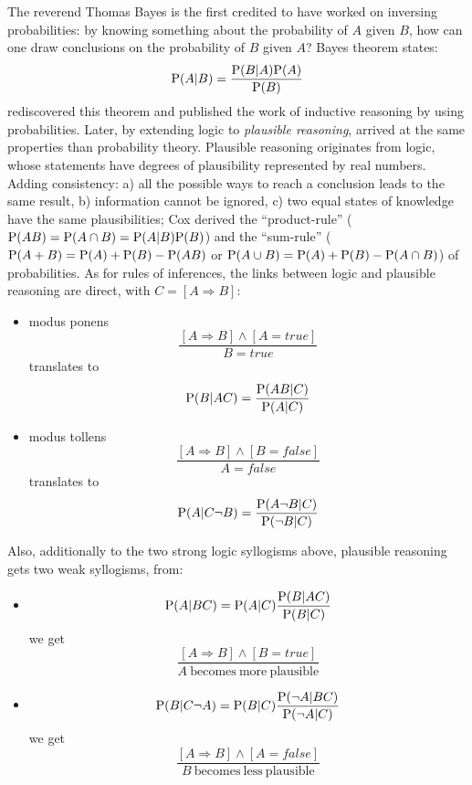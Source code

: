 The reverend Thomas Bayes is the first credited to have worked on inversing probabilities: by knowing something about the probability of $A$ given $B$, how can one draw conclusions on the probability of $B$ given $A$? Bayes theorem states: $$\mathrm{P}(A|B) = \frac{\mathrm{P}(B|A)\mathrm{P}(A)}{\mathrm{P}(B)}$$
\cite{Laplace} rediscovered this theorem and published the work of inductive reasoning by using probabilities. Later, by extending logic to \textit{plausible reasoning}, \cite{Jaynes} arrived at the same properties than \cite{Kolmogorov33} probability theory. Plausible reasoning originates from logic, whose statements have degrees of plausibility represented by real numbers. %
Adding consistency: a) all the possible ways to reach a conclusion leads to the same result, b) information cannot be ignored, c) two equal states of knowledge have the same plausibilities; Cox %
derived the ``product-rule'' ($\mathrm{P}(AB)=\mathrm{P}(A\cap B)=\mathrm{P}(A|B)\mathrm{P}(B)$) and the ``sum-rule'' ($\mathrm{P}(A+B)=\mathrm{P}(A)+\mathrm{P}(B)-\mathrm{P}(AB)$ or $\mathrm{P}(A\cup B) = \mathrm{P}(A)+\mathrm{P}(B)-\mathrm{P}(A\cap B)$) of probabilities. As for rules of inferences, the links between logic and plausible reasoning are direct, with $C=[A\Rightarrow B]$:
\begin{itemize}
    \item modus ponens $$\frac{[A\Rightarrow B] \wedge [A=true]}{B=true}$$ translates to $$\mathrm{P}(B|AC)=\frac{\mathrm{P}(AB|C)}{\mathrm{P}(A|C)}$$
    \item modus tollens $$\frac{[A\Rightarrow B] \wedge [B=false]}{A=false}$$ translates to $$\mathrm{P}(A|C\neg B)=\frac{\mathrm{P}(A \neg B|C)}{\mathrm{P}(\neg B|C)}$$
\end{itemize}
Also, additionally to the two strong logic syllogisms above, plausible reasoning gets two weak syllogisms, from:
\begin{itemize}
    \item $$\mathrm{P}(A|BC)=\mathrm{P}(A|C)\frac{\mathrm{P}(B|AC)}{\mathrm{P}(B|C)}$$ we get $$\frac{[A\Rightarrow B] \wedge [B=true]}{A\ \mathrm{becomes\ more\ plausible}}$$
    \item $$\mathrm{P}(B| C\neg A)=\mathrm{P}(B|C)\frac{\mathrm{P}(\neg A|BC)}{\mathrm{P}(\neg A|C)}$$ we get $$\frac{[A\Rightarrow B] \wedge [A=false]}{B\ \mathrm{becomes\ less\ plausible}}$$
\end{itemize}

